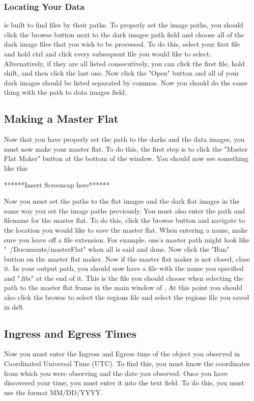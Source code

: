 \documentclass{article}
\begin{document}
\subsubsection{Locating Your Data}

	\oscaar  is built to find files by their paths. To properly set the image paths, you should click the browse button next to the dark images path field and choose all of the dark image files that you wish to be processed. To do this, select your first file and hold ctrl and click every subsequent file you would like to select. Alternatively, if they are all listed consecutively, you can click the first file, hold shift, and then click the last one. Now click the "Open" button and all of your dark images should be listed separated by commas. Now you should do the same thing with the path to data images field.
	
\subsection{Making a Master Flat}
Now that you have properly set the path to the darks and the data images, you must now make your master flat. To do this, the first step is to click the "Master Flat Maker" button at the bottom of the \oscaar window. You should now see something like this

******Insert Screencap here******

Now you must set the paths to the flat images and the dark flat images in the same way you set the image paths previously. You must also enter the path and filename for the master flat. To do this, click the browse button and navigate to the location you would like to save the master flat. When entering a name, make sure you leave off a file extension. For example, one's master path might look like "~/Documents/masterFlat" when all is said and done. Now click the "Run" button on the master flat maker. Now if the master flat maker is not closed, close it. In your output path, you should now have a file with the name you specified and ".fits" at the end of it. This is the file you should choose when selecting the path to the master flat frame in the main window of \oscaar. At this point you should also click the browse to select the regions file and select the regions file you saved in ds9.

\subsection{Ingress and Egress Times}
Now you must enter the Ingress and Egress time of the object you observed in Coordinated Universal Time (UTC). To find this, you must know the coordinates from which you were observing and the date you observed. Once you have discovered your time, you must enter it into the text field. To do this, you must use the format MM/DD/YYYY.
\end{document}
